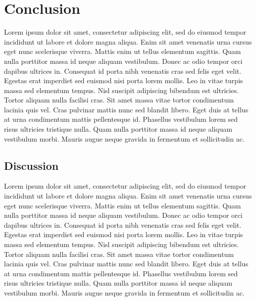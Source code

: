 \chapter{Conclusion}
\label{chap:conclusion}
Lorem ipsum dolor sit amet, consectetur adipiscing elit, sed do eiusmod tempor incididunt ut labore et dolore magna aliqua.
Enim sit amet venenatis urna cursus eget nunc scelerisque viverra.
Mattis enim ut tellus elementum sagittis.
Quam nulla porttitor massa id neque aliquam vestibulum.
Donec ac odio tempor orci dapibus ultrices in.
Consequat id porta nibh venenatis cras sed felis eget velit.
Egestas erat imperdiet sed euismod nisi porta lorem mollis.
Leo in vitae turpis massa sed elementum tempus.
Nisl suscipit adipiscing bibendum est ultricies.
Tortor aliquam nulla facilisi cras. Sit amet massa vitae tortor condimentum lacinia quis vel.
Cras pulvinar mattis nunc sed blandit libero.
Eget duis at tellus at urna condimentum mattis pellentesque id.
Phasellus vestibulum lorem sed risus ultricies tristique nulla.
Quam nulla porttitor massa id neque aliquam vestibulum morbi.
Mauris augue neque gravida in fermentum et sollicitudin ac.


\section{Discussion}
Lorem ipsum dolor sit amet, consectetur adipiscing elit, sed do eiusmod tempor incididunt ut labore et dolore magna aliqua.
Enim sit amet venenatis urna cursus eget nunc scelerisque viverra.
Mattis enim ut tellus elementum sagittis.
Quam nulla porttitor massa id neque aliquam vestibulum.
Donec ac odio tempor orci dapibus ultrices in.
Consequat id porta nibh venenatis cras sed felis eget velit.
Egestas erat imperdiet sed euismod nisi porta lorem mollis.
Leo in vitae turpis massa sed elementum tempus.
Nisl suscipit adipiscing bibendum est ultricies.
Tortor aliquam nulla facilisi cras. Sit amet massa vitae tortor condimentum lacinia quis vel.
Cras pulvinar mattis nunc sed blandit libero.
Eget duis at tellus at urna condimentum mattis pellentesque id.
Phasellus vestibulum lorem sed risus ultricies tristique nulla.
Quam nulla porttitor massa id neque aliquam vestibulum morbi.
Mauris augue neque gravida in fermentum et sollicitudin ac.


